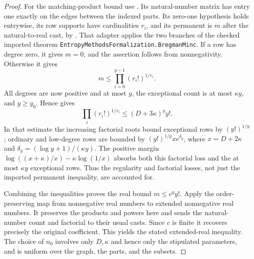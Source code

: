 \begin{proof}
For the matching-product bound use .
Its natural-number matrix has entry one exactly on the edges between
the indexed parts. Its zero-one hypothesis holds entrywise, its row
supports have cardinalities $r_i$, and its permanent is $m$ after the
natural-to-real cast, by .
That adapter applies the two branches of the checked imported theorem
\texttt{EntropyMethodsFormalization.BregmanMinc}. If a row has degree
zero, it gives $m=0$, and the assertion follows from nonnegativity.
Otherwise it gives
\[
 m\le\prod_{i=0}^{y-1}(r_i!)^{1/r_i}.
\]
All degrees are now positive and at most $y$, the exceptional count is
at most $\kappa y$, and $y\ge y_0$. Hence
 gives
\[
 \prod_i(r_i!)^{1/r_i}\le(D+3\kappa)^y y!.
\]
In that estimate the increasing factorial roots bound exceptional rows
by $(y!)^{1/y}$; ordinary and low-degree rows are bounded by
$(y!)^{1/y}xe^{\delta_y}$, where
$x=D+2\kappa$ and $\delta_y=(\log y+1)/(\kappa y)$.
The positive margin
$\log((x+\kappa)/x)-\kappa\log(1/x)$ absorbs both this factorial loss
and the at most $\kappa y$ exceptional rows. Thus the regularity and
factorial losses, not just the imported permanent inequality, are
accounted for.

Combining the inequalities proves the real bound $m\le c^y y!$.
Apply the order-preserving map from nonnegative real numbers to
extended nonnegative real numbers. It preserves the products and
powers here and sends the natural-number count and factorial to their
usual casts. Since $c$ is finite it recovers precisely the original
coefficient. This yields the stated extended-real inequality. The
choice of $n_0$ involves only $D,\kappa$ and hence only the stipulated
parameters, and is uniform over the graph, the parts, and the subsets.
\end{proof}
